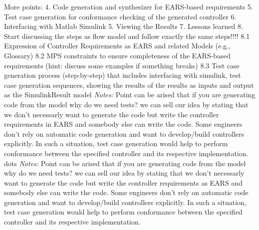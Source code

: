 More points:
4. Code generation and synthesizer for EARS-based requirements
5. Test case generation for conformance checking of the generated controller
6. Interfacing with Matlab Simulink
5. Viewing the Results
7. Lessons learned
8. Start discussing the steps as flow model and follow exactly the same
steps!!!! 
8.1 Expression of Controller Requirements as EARS and related Models (e.g.,
Glossary) 
8.2 MPS constraints to ensure completeness of the EARS-based requirements
(hint: discuss some examples if something breaks) 
8.3 Test case generation process (step-by-step) that includes interfacing with
simulink, test case generation sequences, showing the results of the results as
inputs and output as the SimulinkResult model
\emph{Notes:}
Point can be arised that if you are generating code from the model why do we need tests? we can sell our
idea by stating that we don't necessarly want to generate the code but write the
controller requirements in EARS and somebody else can write the code. Some
engineers don't rely on automatic code generation and want to develop/build
controllers explicitly. In such a situation, test case generation would help to
perform conformance between the specified controller and its respective
implementation. 
dots
\emph{Notes:} 
Point can be arised that if you are generating code from the model why do we need tests? we can sell our
idea by stating that we don't necessarly want to generate the code but write the
controller requirements as EARS and somebody else can write the code. Some
engineers don't rely on automatic code generation and want to develop/build
controllers explicitly. In such a situation, test case generation would help to
perform conformance between the specified controller and its respective implementation.